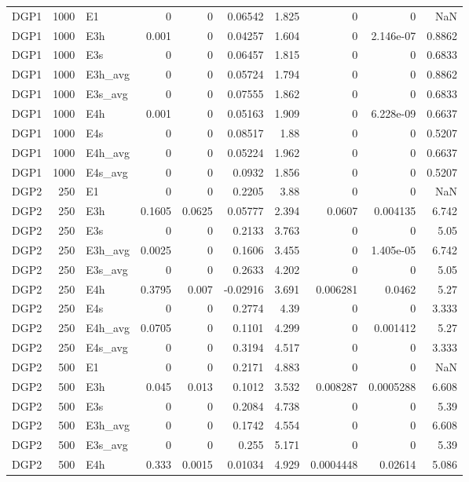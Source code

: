 \begin{table}[!htbp]
{\begin{tabular}{lrlrrrrrrr}
DGP1 & 1000 & E1 & 0 & 0 & 0.06542 & 1.825 & 0 & 0 & NaN \\
DGP1 & 1000 & E3h & 0.001 & 0 & 0.04257 & 1.604 & 0 & 2.146e-07 & 0.8862 \\
DGP1 & 1000 & E3s & 0 & 0 & 0.06457 & 1.815 & 0 & 0 & 0.6833 \\
DGP1 & 1000 & E3h_avg & 0 & 0 & 0.05724 & 1.794 & 0 & 0 & 0.8862 \\
DGP1 & 1000 & E3s_avg & 0 & 0 & 0.07555 & 1.862 & 0 & 0 & 0.6833 \\
DGP1 & 1000 & E4h & 0.001 & 0 & 0.05163 & 1.909 & 0 & 6.228e-09 & 0.6637 \\
DGP1 & 1000 & E4s & 0 & 0 & 0.08517 & 1.88 & 0 & 0 & 0.5207 \\
DGP1 & 1000 & E4h_avg & 0 & 0 & 0.05224 & 1.962 & 0 & 0 & 0.6637 \\
DGP1 & 1000 & E4s_avg & 0 & 0 & 0.0932 & 1.856 & 0 & 0 & 0.5207 \\
DGP2 & 250 & E1 & 0 & 0 & 0.2205 & 3.88 & 0 & 0 & NaN \\
DGP2 & 250 & E3h & 0.1605 & 0.0625 & 0.05777 & 2.394 & 0.0607 & 0.004135 & 6.742 \\
DGP2 & 250 & E3s & 0 & 0 & 0.2133 & 3.763 & 0 & 0 & 5.05 \\
DGP2 & 250 & E3h_avg & 0.0025 & 0 & 0.1606 & 3.455 & 0 & 1.405e-05 & 6.742 \\
DGP2 & 250 & E3s_avg & 0 & 0 & 0.2633 & 4.202 & 0 & 0 & 5.05 \\
DGP2 & 250 & E4h & 0.3795 & 0.007 & -0.02916 & 3.691 & 0.006281 & 0.0462 & 5.27 \\
DGP2 & 250 & E4s & 0 & 0 & 0.2774 & 4.39 & 0 & 0 & 3.333 \\
DGP2 & 250 & E4h_avg & 0.0705 & 0 & 0.1101 & 4.299 & 0 & 0.001412 & 5.27 \\
DGP2 & 250 & E4s_avg & 0 & 0 & 0.3194 & 4.517 & 0 & 0 & 3.333 \\
DGP2 & 500 & E1 & 0 & 0 & 0.2171 & 4.883 & 0 & 0 & NaN \\
DGP2 & 500 & E3h & 0.045 & 0.013 & 0.1012 & 3.532 & 0.008287 & 0.0005288 & 6.608 \\
DGP2 & 500 & E3s & 0 & 0 & 0.2084 & 4.738 & 0 & 0 & 5.39 \\
DGP2 & 500 & E3h_avg & 0 & 0 & 0.1742 & 4.554 & 0 & 0 & 6.608 \\
DGP2 & 500 & E3s_avg & 0 & 0 & 0.255 & 5.171 & 0 & 0 & 5.39 \\
DGP2 & 500 & E4h & 0.333 & 0.0015 & 0.01034 & 4.929 & 0.0004448 & 0.02614 & 5.086 \\

\end{tabular}}
\end{table}
